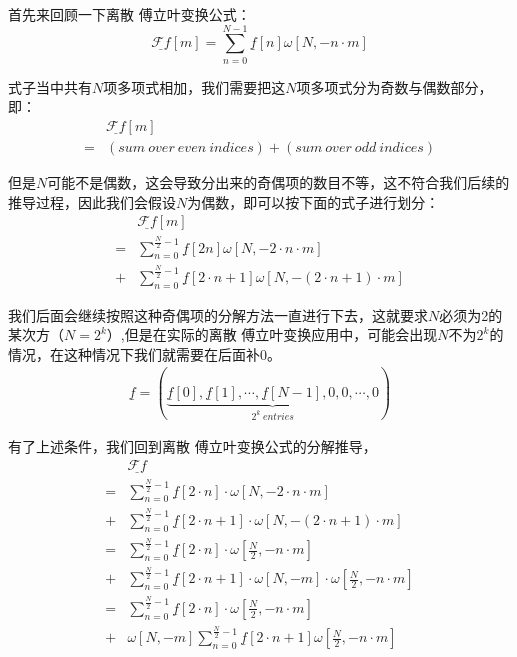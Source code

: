 首先来回顾一下离散 傅立叶变换公式：
$$
	\underline{\mathcal{F}f}[m] =  \sum_{n=0}^{N-1}\underline{f}[n]\omega[N,-n\cdot m]
$$

式子当中共有$N$项多项式相加，我们需要把这$N$项多项式分为奇数与偶数部分，即：
\begin{align*}
	  & \underline{\mathcal{F}f}[m]                          \\
	= & (sum\ over\ even\ indices)+(sum\ over\ odd\ indices)
\end{align*}

但是$N$可能不是偶数，这会导致分出来的奇偶项的数目不等，这不符合我们后续的推导过程，因此我们会假设$N$为偶数，即可以按下面的式子进行划分：
\begin{align*}
	  & \underline{\mathcal{F}f}[m]                                                       \\
	= & \sum_{n=0}^{\frac{N}{2}-1}\underline{f}[2n]\omega[N,-2\cdot n\cdot m]             \\
	+ & \sum_{n=0}^{\frac{N}{2}-1}\underline{f}[2\cdot n+1]\omega[N,-(2\cdot n+1)\cdot m]
\end{align*}

我们后面会继续按照这种奇偶项的分解方法一直进行下去，这就要求$N$必须为2的某次方（$N=2^k$）,但是在实际的离散 傅立叶变换应用中，可能会出现$N$不为$2^k$的情况，在这种情况下我们就需要在后面补$0$。
\begin{align*}
	\underline{f} = (\underbrace{ \underline{f}[0],\underline{f}[1],\cdots,\underline{f}[N-1],0,0,\cdots,0 }_{2^k\ entries} )
\end{align*}

有了上述条件，我们回到离散 傅立叶变换公式的分解推导，
\begin{align*}
	  & \underline{\mathcal{F}f}                                                                                 \\
	= & \sum_{n=0}^{\frac{N}{2}-1}\underline{f}[2\cdot n]\cdot \omega[N,-2\cdot n\cdot m]                        \\
	+ & \sum_{n=0}^{\frac{N}{2}-1}\underline{f}[2\cdot n+1]\cdot \omega[N,-(2\cdot n+1)\cdot m]                  \\
	= & \sum_{n=0}^{\frac{N}{2}-1}\underline{f}[2\cdot n]\cdot \omega[\frac{N}{2},-n\cdot m]                     \\
	+ & \sum_{n=0}^{\frac{N}{2}-1}\underline{f}[2\cdot n+1]\cdot \omega[N,-m]\cdot \omega[\frac{N}{2},-n\cdot m] \\
	= & \sum_{n=0}^{\frac{N}{2}-1}\underline{f}[2\cdot n]\cdot \omega[\frac{N}{2},-n\cdot m]                     \\
	+ & \omega[N,-m]\sum_{n=0}^{\frac{N}{2}-1}\underline{f}[2\cdot n+1]\omega[\frac{N}{2},-n\cdot m]
\end{align*}

